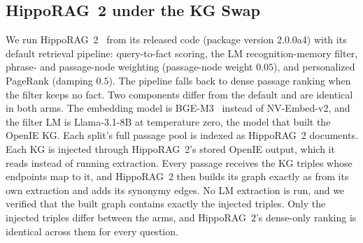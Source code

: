 \documentclass[11pt]{article}
\begin{document}
\subsection{HippoRAG~2 under the KG Swap}
\label{app:hipporag2}
We run HippoRAG~2~\citep{gutierrez2025hipporag2} from its released code (package version 2.0.0a4) with its default retrieval pipeline: query-to-fact scoring, the LM recognition-memory filter, phrase- and passage-node weighting (passage-node weight $0.05$), and personalized PageRank (damping $0.5$). The pipeline falls back to dense passage ranking when the filter keeps no fact. Two components differ from the default and are identical in both arms. The embedding model is BGE-M3~\citep{chen2024bgem3} instead of NV-Embed-v2, and the filter LM is Llama-3.1-8B at temperature zero, the model that built the OpenIE KG. Each split's full passage pool is indexed as HippoRAG~2 documents. Each KG is injected through HippoRAG~2's stored OpenIE output, which it reads instead of running extraction. Every passage receives the KG triples whose endpoints map to it, and HippoRAG~2 then builds its graph exactly as from its own extraction and adds its synonymy edges. No LM extraction is run, and we verified that the built graph contains exactly the injected triples. Only the injected triples differ between the arms, and HippoRAG~2's dense-only ranking is identical across them for every question.

\begin{table}[ht]\centering\footnotesize
\setlength{\tabcolsep}{3pt}
\caption{HippoRAG~2 on 2WikiMultiHop: hit@5 with the injected aligned and independent KGs, its own BGE-M3 dense-only ranking, and BM25; paired swap with bootstrap CI and exact sign test (discordant questions $58$/$10$, $60$/$5$, and $48$/$8$). On the first and held-out splits, the full system gains $+0.390$ and $+0.450$ over its dense-only ranking with the aligned KG and $+0.150$ and $+0.175$ with the independent KG (all $p<10^{-4}$). On the compositional split (Appendix~\ref{app:swaprobust}), it gains $+0.510$ and $+0.310$.}
\label{tab:hipporag2}
\end{table}
\end{document}
